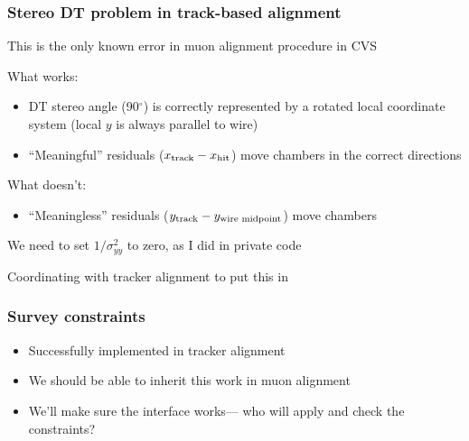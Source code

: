 \documentclass[compress]{beamer}
\begin{document}
\begin{frame}
\frametitle{Stereo DT problem in track-based alignment}
This is the only known error in muon alignment procedure in CVS

\vfill What works:
\begin{itemize}
\item DT stereo angle (90$^\circ$) is correctly represented by a rotated local coordinate system (local $y$ is always parallel to wire)
\item ``Meaningful'' residuals ($x_{\mbox{\scriptsize track}} - x_{\mbox{\scriptsize hit}}$) move chambers in the correct directions
\end{itemize}
\vfill What doesn't:
\begin{itemize}
\item ``Meaningless'' residuals ($y_{\mbox{\scriptsize track}} - y_{\mbox{\scriptsize wire midpoint}}$) move chambers
\end{itemize}

\vfill We need to set $1/\sigma^2_{yy}$ to zero, as I did in private code

\vspace{0.125 cm}
Coordinating with tracker alignment to put this in
\end{frame}

\begin{frame}
\frametitle{Survey constraints}
\begin{itemize}\setlength{\itemsep}{0.75 cm}
\item Successfully implemented in tracker alignment
\item We should be able to inherit this work in muon alignment
\item We'll make sure the interface works--- who will apply and check the constraints?
\end{itemize}
\vfill
\end{frame}
\end{document}
